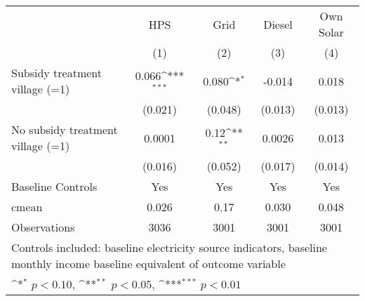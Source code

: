 \def\sym#1{\ifmmode^{#1}\else\(^{#1}\)\fi}
\begin{adjustbox}{max
width={\textwidth},caption={Endline 1 energy source takeup},nofloat=table}
\begin{tabular}{l*{4}{c}}
\toprule
&HPS & Grid & Diesel & Own Solar \\
& (1) & (2) & (3) & (4) \\ \hline
Subsidy treatment village (=1)&    0.066\sym{***}&    0.080\sym{*}  &   -0.014         &    0.018         \\
                &  (0.021)         &  (0.048)         &  (0.013)         &  (0.013)         \\
No subsidy treatment village (=1)&   0.0001         &     0.12\sym{**} &   0.0026         &    0.013         \\
                &  (0.016)         &  (0.052)         &  (0.017)         &  (0.014)         \\
Baseline Controls &      Yes         &      Yes         &      Yes         &      Yes         \\
\midrule
cmean           &    0.026         &     0.17         &    0.030         &    0.048         \\
Observations    &     3036         &     3001         &     3001         &     3001         \\
\bottomrule
\multicolumn{5}{p{\textwidth}}{ \footnotesize Controls included: baseline electricity source indicators, baseline monthly income baseline equivalent of outcome variable}\\
\multicolumn{5}{p{\textwidth}}{ \footnotesize \sym{*} \(p<0.10\), \sym{**} \(p<0.05\), \sym{***} \(p<0.01\)}\\
\end{tabular}\end{adjustbox}
